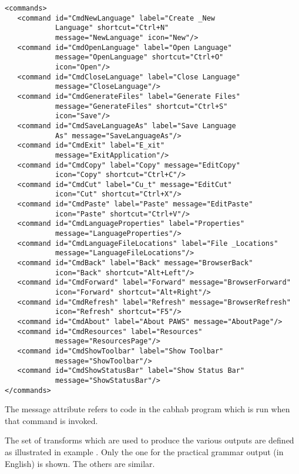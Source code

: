 \ea  \label{xConfigCommands}%
\begin{verbatim} 
<commands>
   <command id="CmdNewLanguage" label="Create _New 
            Language" shortcut="Ctrl+N" 
            message="NewLanguage" icon="New"/>
   <command id="CmdOpenLanguage" label="Open Language" 
            message="OpenLanguage" shortcut="Ctrl+O" 
            icon="Open"/>
   <command id="CmdCloseLanguage" label="Close Language" 
            message="CloseLanguage"/>
   <command id="CmdGenerateFiles" label="Generate Files"
            message="GenerateFiles" shortcut="Ctrl+S" 
            icon="Save"/>
   <command id="CmdSaveLanguageAs" label="Save Language 
            As" message="SaveLanguageAs"/>
   <command id="CmdExit" label="E_xit" 
            message="ExitApplication"/>
   <command id="CmdCopy" label="Copy" message="EditCopy" 
            icon="Copy" shortcut="Ctrl+C"/>
   <command id="CmdCut" label="Cu_t" message="EditCut" 
            icon="Cut" shortcut="Ctrl+X"/>
   <command id="CmdPaste" label="Paste" message="EditPaste" 
            icon="Paste" shortcut="Ctrl+V"/>
   <command id="CmdLanguageProperties" label="Properties" 
            message="LanguageProperties"/>
   <command id="CmdLanguageFileLocations" label="File _Locations" 
            message="LanguageFileLocations"/>
   <command id="CmdBack" label="Back" message="BrowserBack" 
            icon="Back" shortcut="Alt+Left"/>
   <command id="CmdForward" label="Forward" message="BrowserForward" 
            icon="Forward" shortcut="Alt+Right"/>
   <command id="CmdRefresh" label="Refresh" message="BrowserRefresh" 
            icon="Refresh" shortcut="F5"/>
   <command id="CmdAbout" label="About PAWS" message="AboutPage"/>
   <command id="CmdResources" label="Resources" 
            message="ResourcesPage"/>
   <command id="CmdShowToolbar" label="Show Toolbar" 
            message="ShowToolbar"/>
   <command id="CmdShowStatusBar" label="Show Status Bar" 
            message="ShowStatusBar"/>
</commands>
\end{verbatim}
\z


 The message attribute refers to code in the {cabhab} program which is run when that command is invoked.

 The set of transforms which are used to produce the various outputs are defined as illustrated in example . Only the one for the practical grammar output (in English) is shown. The others are similar.

